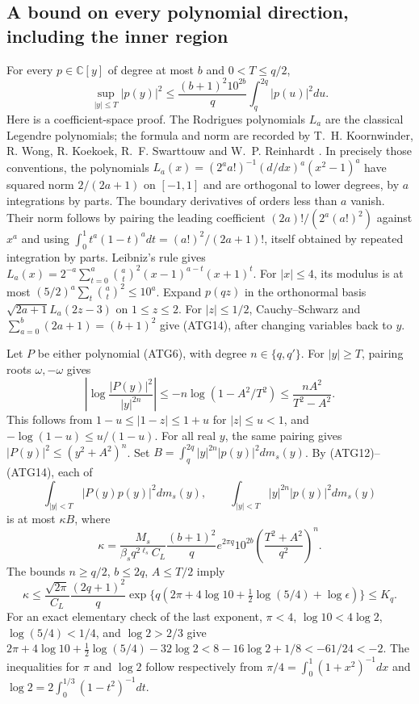 \documentclass[11pt,a4paper]{article}
\begin{document}
\subsection{A bound on every polynomial direction, including the inner region}

For every $p\in\mathbb C[y]$ of degree at most $b$ and
$0<T\le q/2$,
\[
 \sup_{|y|\le T}|p(y)|^2
 \le\frac{(b+1)^2 10^{2b}}q\int_q^{2q}|p(u)|^2du.
\tag{ATG14}
\]
Here is a coefficient-space proof. The Rodrigues polynomials
$L_a$ are the classical Legendre polynomials; the formula and norm
are recorded by T.~H. Koornwinder, R. Wong, R. Koekoek,
R.~F. Swarttouw and W.~P. Reinhardt
\cite[eq.~(18.5.5), Table~18.5.1, and the Legendre and
shifted-Legendre rows of Table~18.3.1]{human:dlmf18}.
In precisely those conventions, the polynomials
$L_a(x)=(2^aa!)^{-1}(d/dx)^a(x^2-1)^a$ have squared norm
$2/(2a+1)$ on $[-1,1]$ and are orthogonal to lower degrees,
by $a$ integrations by parts. The boundary derivatives of orders
less than $a$ vanish. Their norm follows by pairing the leading
coefficient $(2a)!/(2^a(a!)^2)$ against $x^a$ and using
$\int_0^1 t^a(1-t)^a dt=(a!)^2/(2a+1)!$, itself obtained by
repeated integration by parts. Leibniz's rule gives
$L_a(x)=2^{-a}\sum_{t=0}^a\binom at^2(x-1)^{a-t}(x+1)^t$.
For $|x|\le4$, its modulus is at most
$(5/2)^a\sum_t\binom at^2\le10^a$.
Expand $p(qz)$ in the orthonormal basis
$\sqrt{2a+1}L_a(2z-3)$ on $1\le z\le2$.
For $|z|\le1/2$, Cauchy--Schwarz and
$\sum_{a=0}^b(2a+1)=(b+1)^2$ give (ATG14), after changing
variables back to $y$.

Let $P$ be either polynomial (ATG6), with degree $n\in\{q,q'\}$.
For $|y|\ge T$, pairing roots $\omega,-\omega$ gives
\[
 \left|\log\frac{|P(y)|^2}{|y|^{2n}}\right|
 \le-n\log(1-A^2/T^2)\le\frac{nA^2}{T^2-A^2}.
\tag{ATG15}
\]
This follows from $1-u\le|1-z|\le1+u$ for $|z|\le u<1$,
and $-\log(1-u)\le u/(1-u)$.
For all real $y$, the same pairing gives
$|P(y)|^2\le(y^2+A^2)^n$.
Set $B=\int_q^{2q}|y|^{2n}|p(y)|^2dm_s(y)$.
By (ATG12)--(ATG14), each of
\[
 \int_{|y|<T}|P(y)p(y)|^2dm_s(y),\qquad
 \int_{|y|<T}|y|^{2n}|p(y)|^2dm_s(y)
\]
is at most $\kappa B$, where
\[
 \kappa=\frac{M_s}{\beta_s q^{2\ell_s}C_L}
  \frac{(b+1)^2}{q}e^{2\pi q}10^{2b}
             \left(\frac{T^2+A^2}{q^2}\right)^n.
\tag{ATG16}
\]
The bounds $n\ge q/2$, $b\le2q$, $A\le T/2$ imply
\[
 \kappa\le\frac{\sqrt{2\pi}}{C_L}\frac{(2q+1)^2}{q}
 \exp\{q(2\pi+4\log10+\tfrac12\log(5/4)+\log\epsilon)\}
 \le K_q.
\tag{ATG17}
\]
For an exact elementary check of the last exponent,
$\pi<4$, $\log10<4\log2$, $\log(5/4)<1/4$, and
$\log2>2/3$ give
$2\pi+4\log10+\tfrac12\log(5/4)-32\log2
 <8-16\log2+1/8<-61/24<-2$.
The inequalities for $\pi$ and $\log2$ follow respectively from
$\pi/4=\int_0^1(1+x^2)^{-1}dx$ and
$\log2=2\int_0^{1/3}(1-t^2)^{-1}dt$.
\end{document}
